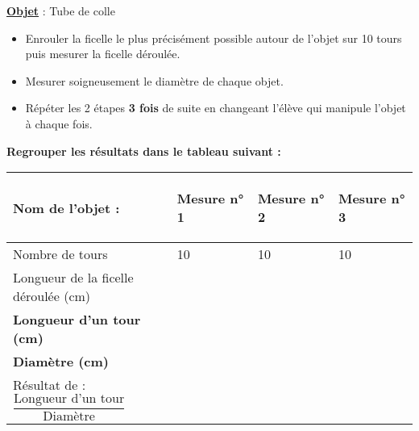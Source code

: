 \documentclass[a4paper,11pt]{article}
\newcommand{\bi}{\begin{itemize}}
\newcommand{\ei}{\end{itemize}}
\begin{document}
\vspace*{1cm}

{\large \textbf{\underline{Objet}} : Tube de colle }\\

\bi

\item Enrouler la ficelle le plus précisément possible autour de l'objet sur 10 tours puis mesurer la ficelle déroulée.\\


\item Mesurer soigneusement le diamètre de chaque objet.\\

\item Répéter les 2 étapes \textbf{3 fois} de suite en changeant l'élève  qui manipule l'objet à chaque fois.\\


\ei

\textbf{Regrouper les résultats dans le tableau suivant : }

\renewcommand{\arraystretch}{2.2}

\begin{flushleft}
\begin{tabular}{|m{7cm}|m{3.5cm}|m{3.5cm}|m{3.5cm}|}
\hline 
\begin{center}
 \textbf{Nom de l'objet :}
 \end{center} & \begin{center}
\textbf{ Mesure n° 1}
 \end{center}  & \begin{center}
\textbf{ Mesure n° 2}
 \end{center} &  \begin{center}
\textbf{Mesure n° 3}
 \end{center}   \\ 
\hline 
Nombre de tours& 10 & 10 &  10   \\ 
\hline 
Longueur de la ficelle déroulée (cm) &  &   &    \\ 
\hline 
\textbf{Longueur d'un tour (cm)}&  &  &    \\ 
\hline 
\textbf{Diamètre (cm)} &  &  &     \\ 
\hline
Résultat de : \hspace*{0.75cm}$\dfrac{\text{Longueur d'un tour}}{\text{Diamètre}}$ &  &  &     \\ 
\hline
\end{tabular} 
\end{flushleft}
\vspace*{0.5cm}
\end{document}
